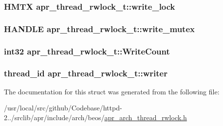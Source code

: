 \subsubsection[{\texorpdfstring{write\+\_\+lock}{write_lock}}]{\setlength{\rightskip}{0pt plus 5cm}H\+M\+TX apr\+\_\+thread\+\_\+rwlock\+\_\+t\+::write\+\_\+lock}\hypertarget{structapr__thread__rwlock__t_a493035e2c36f15766f3642a93a3d2914}{}\label{structapr__thread__rwlock__t_a493035e2c36f15766f3642a93a3d2914}
\subsubsection[{\texorpdfstring{write\+\_\+mutex}{write_mutex}}]{\setlength{\rightskip}{0pt plus 5cm}H\+A\+N\+D\+LE apr\+\_\+thread\+\_\+rwlock\+\_\+t\+::write\+\_\+mutex}\hypertarget{structapr__thread__rwlock__t_abf5aa056b9db8095082d12372f531e3a}{}\label{structapr__thread__rwlock__t_abf5aa056b9db8095082d12372f531e3a}
\subsubsection[{\texorpdfstring{Write\+Count}{WriteCount}}]{\setlength{\rightskip}{0pt plus 5cm}int32 apr\+\_\+thread\+\_\+rwlock\+\_\+t\+::\+Write\+Count}\hypertarget{structapr__thread__rwlock__t_a567cae2d82641fa7e7c88ba91d0797fc}{}\label{structapr__thread__rwlock__t_a567cae2d82641fa7e7c88ba91d0797fc}
\subsubsection[{\texorpdfstring{writer}{writer}}]{\setlength{\rightskip}{0pt plus 5cm}thread\+\_\+id apr\+\_\+thread\+\_\+rwlock\+\_\+t\+::writer}\hypertarget{structapr__thread__rwlock__t_a18110373a77fa08c50177cc517a7b4a2}{}\label{structapr__thread__rwlock__t_a18110373a77fa08c50177cc517a7b4a2}


The documentation for this struct was generated from the following file\+:\begin{DoxyCompactItemize}
\item 
/usr/local/src/github/\+Codebase/httpd-\/2../srclib/apr/include/arch/beos/\hyperlink{beos_2apr__arch__thread__rwlock_8h}{apr\+\_\+arch\+\_\+thread\+\_\+rwlock.\+h}\end{DoxyCompactItemize}
